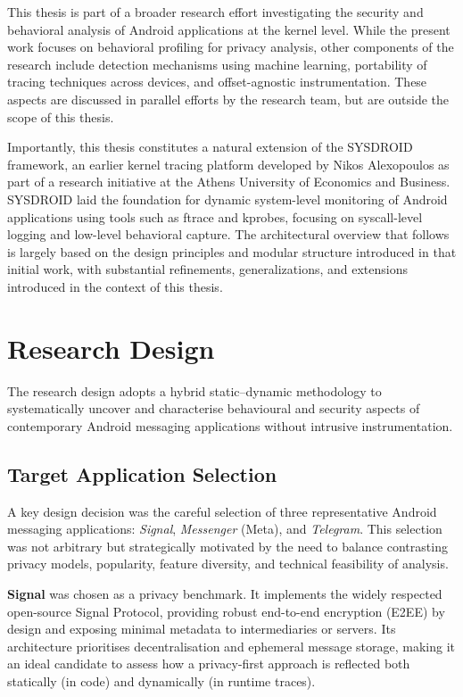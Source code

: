 \documentclass[a4paper,12pt]{report}
\begin{document}
This thesis is part of a broader research effort investigating the security and behavioral analysis of Android applications at the kernel level. While the present work focuses on behavioral profiling for privacy analysis, other components of the research include detection mechanisms using machine learning, portability of tracing techniques across devices, and offset-agnostic instrumentation. These aspects are discussed in parallel efforts by the research team, but are outside the scope of this thesis.

Importantly, this thesis constitutes a natural extension of the SYSDROID framework, an earlier kernel tracing platform developed by Nikos Alexopoulos as part of a research initiative at the Athens University of Economics and Business. SYSDROID laid the foundation for dynamic system-level monitoring of Android applications using tools such as ftrace and kprobes, focusing on syscall-level logging and low-level behavioral capture. The architectural overview that follows is largely based on the design principles and modular structure introduced in that initial work, with substantial refinements, generalizations, and extensions introduced in the context of this thesis.

\section{Research Design}

The research design adopts a hybrid static–dynamic methodology to systematically uncover and characterise behavioural and security aspects of contemporary Android messaging applications without intrusive instrumentation.

\subsection{Target Application Selection}

A key design decision was the careful selection of three representative Android messaging applications: \textit{Signal}, \textit{Messenger} (Meta), and \textit{Telegram}. This selection was not arbitrary but strategically motivated by the need to balance contrasting privacy models, popularity, feature diversity, and technical feasibility of analysis.

\textbf{Signal} was chosen as a privacy benchmark. It implements the widely respected open-source Signal Protocol, providing robust end-to-end encryption (E2EE) by design and exposing minimal metadata to intermediaries or servers. Its architecture prioritises decentralisation and ephemeral message storage, making it an ideal candidate to assess how a privacy-first approach is reflected both statically (in code) and dynamically (in runtime traces).
\end{document}
